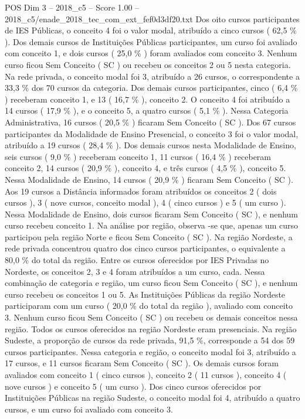 \begin{textsample}{POS Dim 3 – 2018\_c5 – Score 1.00 – 2018\_c5/enade\_2018\_tec\_com\_ext\_fef0d3df20.txt}
Dos oito cursos participantes de IES Públicas, o conceito 4 foi o valor modal, atribuído a cinco cursos ( 62,5 \% ).
Dos demais cursos de Instituições Públicas participantes, um curso foi avaliado com conceito 1, e dois cursos ( 25,0 \% ) foram avaliados com conceito 3.
Nenhum curso ficou Sem Conceito ( SC ) ou recebeu os conceitos 2 ou 5 nesta categoria.
Na rede privada, o conceito modal foi 3, atribuído a 26 cursos, o correspondente a 33,3 \% dos 70 cursos da categoria.
Dos demais cursos participantes, cinco ( 6,4 \% ) receberam conceito 1, e 13 ( 16,7 \% ), conceito 2.
O conceito 4 foi atribuído a 14 cursos ( 17,9 \% ), e o conceito 5, a quatro cursos ( 5,1 \% ).
Nessa Categoria Administrativa, 16 cursos ( 20,5 \% ) ficaram Sem Conceito ( SC ).
Dos 67 cursos participantes da Modalidade de Ensino Presencial, o conceito 3 foi o valor modal, atribuído a 19 cursos ( 28,4 \% ).
Dos demais cursos nesta Modalidade de Ensino, seis cursos ( 9,0 \% ) receberam conceito 1, 11 cursos ( 16,4 \% ) receberam conceito 2, 14 cursos ( 20,9 \% ), conceito 4, e três cursos ( 4,5 \% ), conceito 5.
Nessa Modalidade de Ensino, 14 cursos ( 20,9 \% ) ficaram Sem Conceito ( SC ).
Aos 19 cursos a Distância informados foram atribuídos os conceitos 2 ( dois cursos ), 3 ( nove cursos, conceito modal ), 4 ( cinco cursos ) e 5 ( um curso ).
Nessa Modalidade de Ensino, dois cursos ficaram Sem Conceito ( SC ), e nenhum curso recebeu conceito 1.
Na análise por região, observa -se que, apenas um curso participou pela região Norte e ficou Sem Conceito ( SC ).
Na região Nordeste, a rede privada concentrou quatro dos cinco cursos participantes, o equivalente a 80,0 \% do total da região.
Entre os cursos oferecidos por IES Privadas no Nordeste, os conceitos 2, 3 e 4 foram atribuídos a um curso, cada.
Nessa combinação de categoria e região, um curso ficou Sem Conceito ( SC ), e nenhum curso recebeu os conceitos 1 ou 5.
As Instituições Públicas da região Nordeste participaram com um curso ( 20,0 \% do total da região ), avaliado com conceito 3.
Nenhum curso ficou Sem Conceito ( SC ) ou recebeu os demais conceitos nessa região.
Todos os cursos oferecidos na região Nordeste eram presenciais.
Na região Sudeste, a proporção de cursos da rede privada, 91,5 \%, corresponde a 54 dos 59 cursos participantes.
Nessa categoria e região, o conceito modal foi 3, atribuído a 17 cursos, e 11 cursos ficaram Sem Conceito ( SC ).
Os demais cursos foram avaliados com conceito 1 ( cinco cursos ), conceito 2 ( 11 cursos ), conceito 4 ( nove cursos ) e conceito 5 ( um curso ).
Dos cinco cursos oferecidos por Instituições Públicas na região Sudeste, o conceito modal foi 4, atribuído a quatro cursos, e um curso foi avaliado com conceito 3.

\end{textsample}
